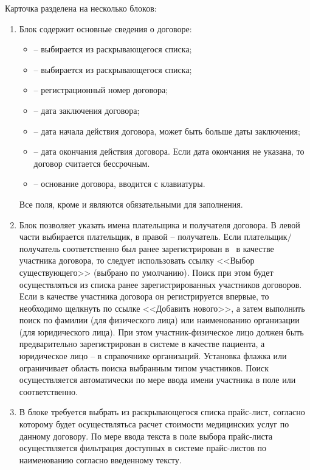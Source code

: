 Карточка разделена на несколько блоков:
\begin{enumerate}
 \item Блок  содержит основные сведения о договоре:
 \begin{itemize}
  \item {} -- выбирается из раскрывающегося списка;
  \item {} -- выбирается из раскрывающегося списка;
  \item {} -- регистрационный номер договора;
  \item {} -- дата заключения договора;
  \item {} -- дата начала действия договора, может быть больше даты заключения;
  \item {} -- дата окончания действия договора. Если дата окончания не указана, то договор считается бессрочным.
  \item {} -- основание договора, вводится с клавиатуры.
 \end{itemize}
 Все поля, кроме  и  являются обязательными для заполнения.
 
 \item Блок  позволяет указать имена плательщика и получателя договора. В левой части выбирается плательщик, в правой -- получатель. Если плательщик$\slash$получатель  соответственно был ранее зарегистрирован в \tmisp~в качестве участника договора, то следует использовать ссылку <<Выбор существующего>> (выбрано по умолчанию). Поиск при этом будет осуществляться из списка ранее зарегистрированных участников договоров. Если в качестве участника договора он регистрируется впервые, то необходимо щелкнуть по ссылке <<Добавить нового>>, а затем выполнить поиск по фамилии (для физического лица) или наименованию организации (для юридического лица). При этом участник-физическое лицо должен быть предварительно зарегистрирован в системе в качестве пациента, а юридическое лицо -- в справочнике организаций. Установка флажка  или  ограничивает область поиска выбранным типом участников.
 Поиск осуществляется автоматически по мере ввода имени участника в поле  или  соответственно.
 
 \item В блоке  требуется выбрать из раскрывающегося списка прайс-лист, согласно которому будет осуществлятьса расчет стоимости медицинских услуг по данному договору. По мере ввода текста в поле выбора прайс-листа осуществляется фильтрация доступных в системе прайс-листов по наименованию согласно введенному тексту.
 

\end{enumerate}
